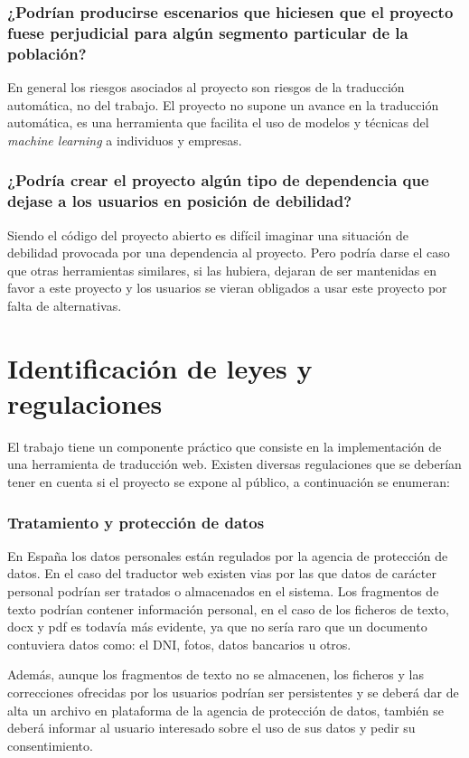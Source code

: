 \subsubsection{¿Podrían producirse escenarios que hiciesen que el proyecto fuese perjudicial para algún segmento particular de la población?}

En general los riesgos asociados al proyecto son riesgos de la traducción automática, no del trabajo. El proyecto no supone un avance en la traducción automática, es una herramienta que facilita el uso de modelos y técnicas del \textit{machine learning} a individuos y empresas.

\subsubsection{¿Podría crear el proyecto algún tipo de dependencia que dejase a los usuarios en posición de debilidad?}

Siendo el código del proyecto abierto es difícil imaginar una situación de debilidad provocada por una dependencia al proyecto. Pero podría darse el caso que otras herramientas similares, si las hubiera, dejaran de ser mantenidas en favor a este proyecto y los usuarios se vieran obligados a usar este proyecto por falta de alternativas.

\section{Identificación de leyes y regulaciones}
El trabajo tiene un componente práctico que consiste en la implementación de una herramienta de traducción web.
Existen diversas regulaciones que se deberían tener en cuenta si el proyecto se expone al público, a continuación se enumeran:
\subsubsection{Tratamiento y protección de datos}
En España los datos personales están regulados por la agencia de protección de datos. En el caso del traductor web existen vias por las que datos de carácter personal podrían ser tratados o almacenados en el sistema. Los fragmentos de texto podrían contener información personal, en el caso de los ficheros de texto, docx y pdf es todavía más evidente, ya que no sería raro que un documento contuviera datos como: el DNI, fotos, datos bancarios u otros.

Además, aunque los fragmentos de texto no se almacenen, los ficheros y las correcciones ofrecidas por los usuarios podrían ser persistentes y se deberá dar de alta un archivo en plataforma de la agencia de protección de datos, también se deberá informar al usuario interesado sobre el uso de sus datos y pedir su consentimiento.

